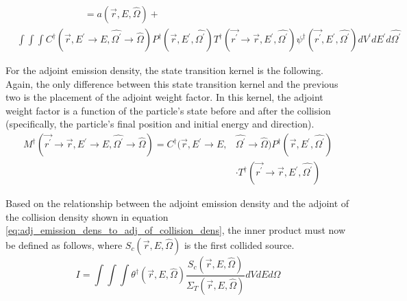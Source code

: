 \begin{equation*}
  \begin{split}
    & \qquad \qquad \qquad \quad = a(\vec{r},E,\hat{\Omega}) + \\
    & \int\int\int 
    C^{\dagger}(\vec{r},E^{'} \to E,\hat{\Omega^{'}} \to \hat{\Omega})
    P^{\dagger}(\vec{r},E^{'},\hat{\Omega^{'}})
    T^{\dagger}(\vec{r^{'}} \to \vec{r},E^{'},\hat{\Omega^{'}})
    \psi^{\dagger}(\vec{r^{'}},E^{'},\hat{\Omega^{'}}) dV^{'}dE^{'}d\hat{\Omega^{'}}
  \end{split}
\end{equation*}

For the adjoint emission density, the state transition kernel is the following.
Again, the only difference between this state transition kernel and the 
previous two is the placement of the adjoint weight factor. In this kernel,
the adjoint weight factor is a function of the particle's state before and
after the collision (specifically, the particle's final position and initial
energy and direction).
\begin{equation}
  \begin{split}
    M^{\dagger}(\vec{r^{'}} \to \vec{r},E^{'} \to E,\hat{\Omega^{'}} \to \hat{\Omega})
    = C^{\dagger}(\vec{r},E^{'} \to E,&\hat{\Omega^{'}} \to \hat{\Omega})
    P^{\dagger}(\vec{r},E^{'},\hat{\Omega^{'}})  \\
    & \cdot T^{\dagger}(\vec{r^{'}} \to \vec{r},E^{'},\hat{\Omega^{'}}) 
  \end{split}
\end{equation}

Based on the relationship between the adjoint emission density and the adjoint
of the collision density shown in equation 
\ref{eq:adj_emission_dens_to_adj_of_collision_dens}, the inner product must now
be defined as follows, where $S_c(\vec{r},E,\hat{\Omega})$ is the first
collided source.
\begin{equation}
  I = \int\int\int \theta^{\dagger}(\vec{r},E,\hat{\Omega})
  \frac{S_c(\vec{r},E,\hat{\Omega})}{\Sigma_T(\vec{r},E,\hat{\Omega})}
  dV dE d\hat{\Omega}
\end{equation}
